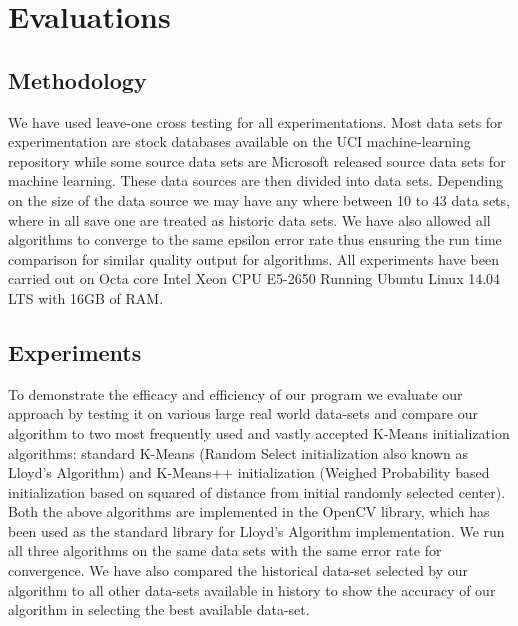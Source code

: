 \chapter{Evaluations}
\label{chap-five}

\section{Methodology}
We have used leave-one cross testing for all experimentations. Most data sets for experimentation are stock databases available on the UCI machine-learning repository while some source data sets are Microsoft released source data sets for machine learning.
These data sources are then divided into data sets. Depending on the size of the data source\cite{uci_machine_repo} we may have any where between 10 to 43 data sets, where in all save one are treated as historic data sets. We have also allowed all algorithms to converge to the same epsilon error rate thus ensuring the run time comparison for similar quality output for algorithms.
All experiments have been carried out on Octa core Intel Xeon CPU E5-2650 Running Ubuntu Linux 14.04 LTS with 16GB of RAM.
\section{Experiments}
To demonstrate the efficacy and efficiency of our program we evaluate our approach by testing it on various large real world data-sets and compare our algorithm to two most frequently used and vastly accepted K-Means initialization algorithms: standard K-Means (Random Select initialization also known as Lloyd's Algorithm) and K-Means++ initialization (Weighed Probability based initialization based on squared of distance from initial randomly selected center). Both the above algorithms are implemented in the OpenCV library, which has been used as the standard library for Lloyd’s Algorithm implementation. We run all three algorithms on the same data sets with the same error rate for convergence.
We have also compared the historical data-set selected by our algorithm to all other data-sets available in history to show the accuracy of our algorithm in selecting the best available data-set.

